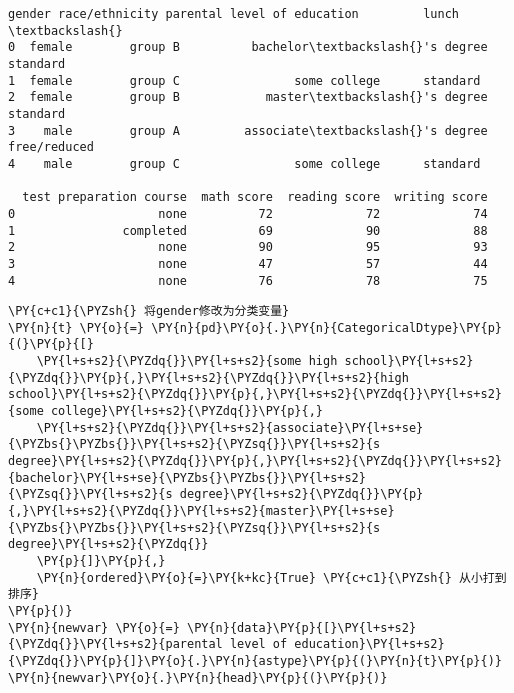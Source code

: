             \begin{tcolorbox}[breakable, size=fbox, boxrule=.5pt, pad at break*=1mm, opacityfill=0]
\begin{Verbatim}[commandchars=\\\{\}]
   gender race/ethnicity parental level of education         lunch  \textbackslash{}
0  female        group B          bachelor\textbackslash{}'s degree      standard
1  female        group C                some college      standard
2  female        group B            master\textbackslash{}'s degree      standard
3    male        group A         associate\textbackslash{}'s degree  free/reduced
4    male        group C                some college      standard

  test preparation course  math score  reading score  writing score
0                    none          72             72             74
1               completed          69             90             88
2                    none          90             95             93
3                    none          47             57             44
4                    none          76             78             75
\end{Verbatim}
\end{tcolorbox}
        
    \begin{tcolorbox}[breakable, size=fbox, boxrule=1pt, pad at break*=1mm,colback=cellbackground, colframe=cellborder]
\begin{Verbatim}[commandchars=\\\{\}]
\PY{c+c1}{\PYZsh{} 将gender修改为分类变量}
\PY{n}{t} \PY{o}{=} \PY{n}{pd}\PY{o}{.}\PY{n}{CategoricalDtype}\PY{p}{(}\PY{p}{[}
    \PY{l+s+s2}{\PYZdq{}}\PY{l+s+s2}{some high school}\PY{l+s+s2}{\PYZdq{}}\PY{p}{,}\PY{l+s+s2}{\PYZdq{}}\PY{l+s+s2}{high school}\PY{l+s+s2}{\PYZdq{}}\PY{p}{,}\PY{l+s+s2}{\PYZdq{}}\PY{l+s+s2}{some college}\PY{l+s+s2}{\PYZdq{}}\PY{p}{,}
    \PY{l+s+s2}{\PYZdq{}}\PY{l+s+s2}{associate}\PY{l+s+se}{\PYZbs{}\PYZbs{}}\PY{l+s+s2}{\PYZsq{}}\PY{l+s+s2}{s degree}\PY{l+s+s2}{\PYZdq{}}\PY{p}{,}\PY{l+s+s2}{\PYZdq{}}\PY{l+s+s2}{bachelor}\PY{l+s+se}{\PYZbs{}\PYZbs{}}\PY{l+s+s2}{\PYZsq{}}\PY{l+s+s2}{s degree}\PY{l+s+s2}{\PYZdq{}}\PY{p}{,}\PY{l+s+s2}{\PYZdq{}}\PY{l+s+s2}{master}\PY{l+s+se}{\PYZbs{}\PYZbs{}}\PY{l+s+s2}{\PYZsq{}}\PY{l+s+s2}{s degree}\PY{l+s+s2}{\PYZdq{}}
    \PY{p}{]}\PY{p}{,}
    \PY{n}{ordered}\PY{o}{=}\PY{k+kc}{True} \PY{c+c1}{\PYZsh{} 从小打到排序}
\PY{p}{)}
\PY{n}{newvar} \PY{o}{=} \PY{n}{data}\PY{p}{[}\PY{l+s+s2}{\PYZdq{}}\PY{l+s+s2}{parental level of education}\PY{l+s+s2}{\PYZdq{}}\PY{p}{]}\PY{o}{.}\PY{n}{astype}\PY{p}{(}\PY{n}{t}\PY{p}{)}
\PY{n}{newvar}\PY{o}{.}\PY{n}{head}\PY{p}{(}\PY{p}{)}
\end{Verbatim}
\end{tcolorbox}

